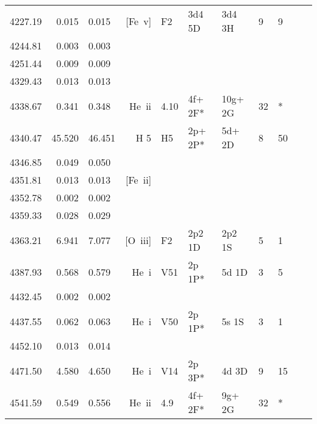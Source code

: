 \begin{longtable}{lrlrlllllll}
 4227.19 &   0.015 &   0.015 &  [Fe~{\sc v}]    &  F2        &  3d4 5D    &  3d4 3H    &          9 &        9    \\
 4244.81 &   0.003 &   0.003                                                                                      \\
 4251.44 &   0.009 &   0.009                                                                                      \\
 4329.43 &   0.013 &   0.013                                                                                      \\
 4338.67 &   0.341 &   0.348 &  He~{\sc ii}     &  4.10      &  4f+ 2F*   &  10g+ 2G   &         32 &        *    \\
 4340.47 &  45.520 &  46.451 &  H 5       &  H5        &  2p+ 2P*   &  5d+ 2D    &          8 &       50          \\
 4346.85 &   0.049 &   0.050                                                                                      \\
 4351.81 &   0.013 &   0.013 &  [Fe~{\sc ii}]   &            &            &            &            &             \\
 4352.78 &   0.002 &   0.002                                                                                      \\
 4359.33 &   0.028 &   0.029                                                                                      \\
 4363.21 &   6.941 &   7.077 &  [O~{\sc iii}]   &  F2        &  2p2 1D    &  2p2 1S    &          5 &        1    \\
 4387.93 &   0.568 &   0.579 &  He~{\sc i}      &  V51       &  2p 1P*    &  5d 1D     &          3 &        5    \\
 4432.45 &   0.002 &   0.002                                                                                      \\
 4437.55 &   0.062 &   0.063 &  He~{\sc i}      &  V50       &  2p 1P*    &  5s 1S     &          3 &        1    \\
 4452.10 &   0.013 &   0.014                                                                                      \\
 4471.50 &   4.580 &   4.650 &  He~{\sc i}      &  V14       &  2p 3P*    &  4d 3D     &          9 &       15    \\
 4541.59 &   0.549 &   0.556 &  He~{\sc ii}     &  4.9       &  4f+ 2F*   &  9g+ 2G    &         32 &        *    \\

\end{longtable}
